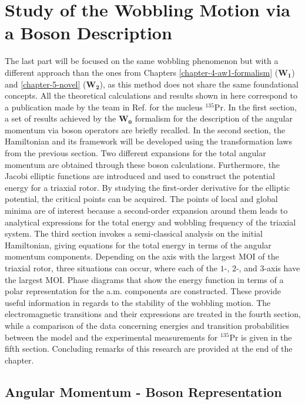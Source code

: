 \chapter{Study of the Wobbling Motion via a Boson Description}
\label{extra-chapter-new-boson}

The last part will be focused on the same wobbling phenomenon but with a different approach than the ones from Chapters \ref{chapter-4-aw1-formalism} ($\mathbf{W_1}$) and \ref{chapter-5-novel} ($\mathbf{W_2}$), as this method does not share the same foundational concepts. All the theoretical calculations and results shown in here correspond to a publication made by the team in Ref. \cite{raduta2020new} for the nucleus $^{135}$Pr. In the first section, a set of results achieved by the $\mathbf{W_0}$ formalism for the description of the angular momentum via boson operators are briefly recalled. In the second section, the Hamiltonian and its framework will be developed using the transformation laws from the previous section. Two different expansions for the total angular momentum are obtained through these boson calculations. Furthermore, the Jacobi elliptic functions are introduced and used to construct the potential energy for a triaxial rotor. By studying the first-order derivative for the elliptic potential, the critical points can be acquired. The points of local and global minima are of interest because a second-order expansion around them leads to analytical expressions for the total energy and wobbling frequency of the triaxial system. The third section invokes a semi-classical analysis on the initial Hamiltonian, giving equations for the total energy in terms of the angular momentum components. Depending on the axis with the largest MOI of the triaxial rotor, three situations can occur, where each of the $1$-, $2$-, and $3$-axis have the largest MOI. Phase diagrams that show the energy function in terms of a polar representation for the a.m. components are constructed. These provide useful information in regards to the stability of the wobbling motion. The electromagnetic transitions and their expressions are treated in the fourth section, while a comparison of the data concerning energies and transition probabilities between the model and the experimental measurements for $^{135}$Pr is given in the fifth section. Concluding remarks of this research are provided at the end of the chapter.

\section{Angular Momentum - Boson Representation}
\label{section-intro-boson-representation}

